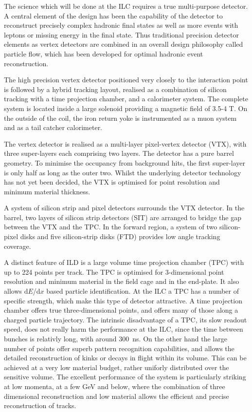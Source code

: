 The science which will be done at the ILC requires a true multi-purpose detector. A central element of the design has been the capability of the detector to reconstruct precisely complex hadronic final states as well as more events with leptons or missing energy in the final state. Thus traditional precision detector elements as vertex detectors are combined in an overall design philosophy called particle flow, which has been developed for optimal hadronic event reconstruction.

The high precision vertex detector positioned very closely to the interaction point is followed by a hybrid tracking layout, realised as a combination of silicon tracking with a time projection chamber, and a calorimeter system. The complete system is located inside a large solenoid providing a magnetic field of 3.5-4 T. On the outside of the coil, the iron return yoke is instrumented as a muon system and as a tail catcher calorimeter. 

The vertex detector is realised as a multi-layer pixel-vertex detector (VTX), with three super-layers each comprising two layers. The detector has a pure barrel geometry. To minimise the occupancy from background hits,
the first super-layer is only half as long as the outer two. Whilst the underlying detector technology has not yet been decided, 
the VTX is optimised for point resolution and minimum material thickness. 
	
A system of silicon strip and pixel detectors surrounds the VTX detector. In the barrel, two layers of silicon strip detectors (SIT) are arranged to bridge the gap between the VTX and the TPC. In the forward region, a system of two silicon-pixel disks and five silicon-strip disks (FTD) provides low angle tracking coverage.

A distinct feature of ILD is a large volume time projection chamber (TPC) with up to 224 points per track. The TPC is optimised for 3-dimensional point resolution and minimum material in the field cage and in the end-plate. It also allows d$E$/d$x$ based particle identification. At the ILC a TPC has a number of specific strength, which make this type of detector attractive. A time projection chamber offers true three-dimensional points, and offers many of those along a charged particle trajectory. The intrinsic disadvantage of a TPC, its slow readout speed, does not really harm the performance at the ILC, since the time between bunches is relativly long, with around 300~ns. On the other hand the large number of points offer superb pattern recognition capabilities, and allows the detailed reconstruction of kinks or decays in flight within its volume. This can be achieved at a very low material budget, rather uniforly distributed over the sensitive volume. The excellent performance of the system is particularly striking at low momenta, at a few GeV and below, where the combination of three dimensional reconstruction and low material allows the efficient and precise reconstruction of tracks. 

